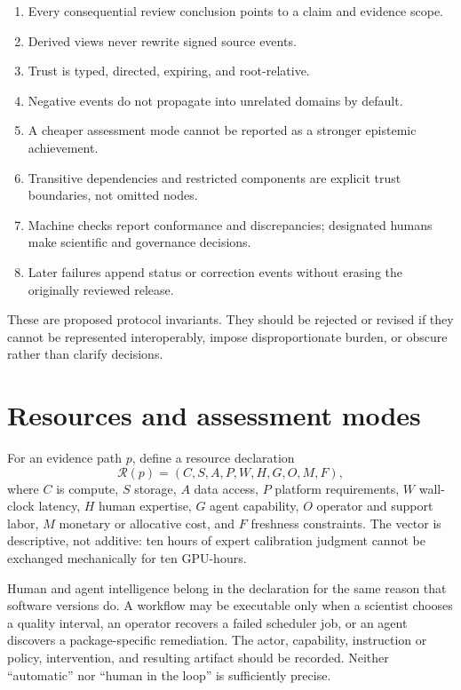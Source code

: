\documentclass[11pt]{article}
\begin{document}
\begin{enumerate}
  \item Every consequential review conclusion points to a claim and evidence scope.
  \item Derived views never rewrite signed source events.
  \item Trust is typed, directed, expiring, and root-relative.
  \item Negative events do not propagate into unrelated domains by default.
  \item A cheaper assessment mode cannot be reported as a stronger epistemic achievement.
  \item Transitive dependencies and restricted components are explicit trust boundaries, not omitted nodes.
  \item Machine checks report conformance and discrepancies; designated humans make scientific and governance decisions.
  \item Later failures append status or correction events without erasing the originally reviewed release.
\end{enumerate}

These are proposed protocol invariants. They should be rejected or revised if they cannot be represented interoperably, impose disproportionate burden, or obscure rather than clarify decisions.

\section{Resources and assessment modes}
\label{sec:resources}

For an evidence path $p$, define a resource declaration
\[
\mathcal{R}(p)=(C,S,A,P,W,H,G,O,M,F),
\]
where $C$ is compute, $S$ storage, $A$ data access, $P$ platform requirements, $W$ wall-clock latency, $H$ human expertise, $G$ agent capability, $O$ operator and support labor, $M$ monetary or allocative cost, and $F$ freshness constraints. The vector is descriptive, not additive: ten hours of expert calibration judgment cannot be exchanged mechanically for ten GPU-hours.

Human and agent intelligence belong in the declaration for the same reason that software versions do. A workflow may be executable only when a scientist chooses a quality interval, an operator recovers a failed scheduler job, or an agent discovers a package-specific remediation. The actor, capability, instruction or policy, intervention, and resulting artifact should be recorded. Neither ``automatic'' nor ``human in the loop'' is sufficiently precise.
\end{document}
